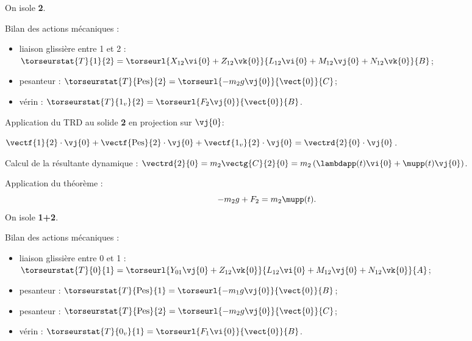 \begin{corrigebox}
On isole \textbf{2}. 

\vspace{.25cm}

Bilan des actions mécaniques : 
\begin{itemize}
\item liaison glissière entre 1 et 2 : 
$\torseurstat{T}{1}{2}= \torseurl{X_{12}\vi{0}+Z_{12}\vk{0}}{L_{12}\vi{0}+M_{12}\vj{0}+N_{12}\vk{0}}{B}$;
\item pesanteur : $\torseurstat{T}{\text{Pes}}{2}= \torseurl{-m_2 g \vj{0}}{\vect{0}}{C}$;
\item vérin : $\torseurstat{T}{1_v}{2}= \torseurl{F_2 \vj{0}}{\vect{0}}{B}$.
\end{itemize}

\vspace{.25cm}

Application du TRD au solide \textbf{2} en projection sur $\vj{0}$: 

$\vectf{1}{2}\cdot \vj{0} + \vectf{\text{Pes}}{2}\cdot \vj{0}+ \vectf{1_v}{2}\cdot \vj{0} = \vectrd{2}{0}\cdot \vj{0}$.

\vspace{.25cm}

Calcul de la résultante dynamique : 
$\vectrd{2}{0} = m_2 \vectg{C}{2}{0} = m_2 \left(\lambdapp (t) \vi{0}+\mupp (t) \vj{0}\right)$.

Application du théorème : 
$$
-m_2g  + F_2 = m_2\mupp (t).
$$
On isole \textbf{1+2}. 

\vspace{.25cm}

Bilan des actions mécaniques : 
\begin{itemize}
\item liaison glissière entre 0 et 1 : 
$\torseurstat{T}{0}{1}= \torseurl{Y_{01}\vj{0}+Z_{12}\vk{0}}{L_{12}\vi{0}+M_{12}\vj{0}+N_{12}\vk{0}}{A}$;
\item pesanteur : $\torseurstat{T}{\text{Pes}}{1}= \torseurl{-m_1 g \vj{0}}{\vect{0}}{B}$;
\item pesanteur : $\torseurstat{T}{\text{Pes}}{2}= \torseurl{-m_2 g \vj{0}}{\vect{0}}{C}$;
\item vérin : $\torseurstat{T}{0_v}{1}= \torseurl{F_1 \vi{0}}{\vect{0}}{B}$.
\end{itemize}


\end{corrigebox}
